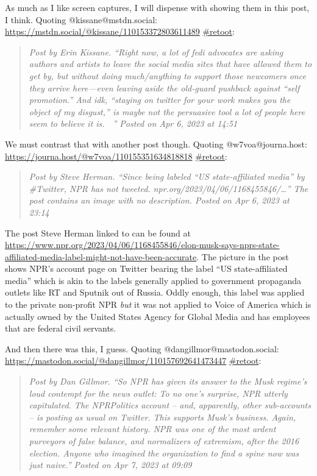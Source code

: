 As much as I like screen captures, I will dispense with showing them in
this post, I think. Quoting @kissane@mstdn.social:
\url{https://mstdn.social/@kissane/110153372803611489}
\href{\%7B\%7Bsite.url\%7D\%7D/img/bring-creators-to-masto.jpg}{\#retoot}:

\begin{quote}
\emph{Post by Erin Kissane. ``Right now, a lot of fedi advocates are
asking authors and artists to leave the social media sites that have
allowed them to get by, but without doing much/anything to support those
newcomers once they arrive here---even leaving aside the old-guard
pushback against ``self promotion.'' And idk, ``staying on twitter for
your work makes you the object of my disgust,'' is maybe not the
persuasive tool a lot of people here seem to believe it is. 🤷🏻'' Posted
on Apr 6, 2023 at 14:51}
\end{quote}

We must contrast that with another post though. Quoting
@w7voa@journa.host: \url{https://journa.host/@w7voa/110155351634818818}
\href{\%7B\%7Bsite.url\%7D\%7D/img/w7voa-on-npr-going-silent-on-twitter.jpg}{\#retoot}:

\begin{quote}
\emph{Post by Steve Herman. ``Since being labeled ``US state-affiliated
media'' by \#Twitter, NPR has not tweeted.
npr.org/2023/04/06/1168455846/\ldots'' The post contains an image with
no description. Posted on Apr 6, 2023 at 23:14}
\end{quote}

The post Steve Herman linked to can be found at
\url{https://www.npr.org/2023/04/06/1168455846/elon-musk-says-nprs-state-affiliated-media-label-might-not-have-been-accurate}.
The picture in the post shows NPR's account page on Twitter bearing the
label ``US state-affiliated media'' which is akin to the labels
generally applied to government propaganda outlets like RT and Sputnik
out of Russia. Oddly enough, this label was applied to the private
non-profit NPR \emph{but} it was not applied to Voice of America which
is actually owned by the United States Agency for Global Media and has
employees that are federal civil servants.

And then there was this, I guess. Quoting @dangillmor@mastodon.social:
\url{https://mastodon.social/@dangillmor/110157692641473447}
\href{\%7B\%7Bsite.url\%7D\%7D/img/gillmor-on-capitulation.jpg}{\#retoot}:

\begin{quote}
\emph{Post by Dan Gillmor. ``So NPR has given its answer to the Musk
regime's loud contempt for the news outlet: To no one's surprise, NPR
utterly capitulated. The NPRPolitics account -- and, apparently, other
sub-accounts -- is posting as usual on Twitter. This supports Musk's
business. Again, remember some relevant history. NPR was one of the most
ardent purveyors of false balance, and normalizers of extremism, after
the 2016 election. Anyone who imagined the organization to find a spine
now was just naive.'' Posted on Apr 7, 2023 at 09:09}
\end{quote}

